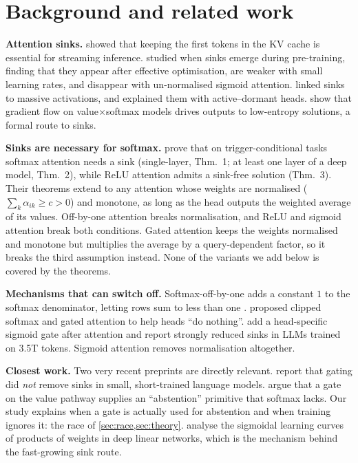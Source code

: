 \documentclass{article} %
\begin{document}
\section{Background and related work}
\textbf{Attention sinks.} \citet{xiao2024streamingllm} showed that keeping the first tokens in the KV cache is
essential for streaming inference. \citet{gu2025when} studied when sinks emerge during pre-training, finding
that they appear after effective optimisation, are weaker with small learning rates, and disappear with
un-normalised sigmoid attention. \citet{sun2024massive} linked sinks to massive activations, and
\citet{guo2024active} explained them with active--dormant heads. \citet{varre2026polarizes} show that
gradient flow on value$\times$softmax models drives outputs to low-entropy solutions, a formal route to sinks.

\textbf{Sinks are necessary for softmax.} \citet{ranmilo2026sinks} prove that on trigger-conditional tasks
softmax attention needs a sink (single-layer, Thm.~1; at least one layer of a deep model, Thm.~2),
while ReLU attention admits a sink-free solution (Thm.~3). Their theorems extend to any attention whose
weights are normalised ($\sum_k \alpha_{ik}\ge c>0$) and monotone, as long as the head outputs the weighted
average of its values. Off-by-one attention breaks normalisation, and ReLU and sigmoid attention break both
conditions. Gated attention keeps the weights normalised and monotone but multiplies the average by a
query-dependent factor, so it breaks the third assumption instead. None of the variants we add below is
covered by the theorems.

\textbf{Mechanisms that can switch off.} Softmax-off-by-one adds a constant $1$ to the softmax
denominator, letting rows sum to less than one \citep{miller2023off}. \citet{bondarenko2023quantizable}
proposed clipped softmax and gated attention to help heads ``do nothing''. \citet{qiu2025gated} add a
head-specific sigmoid gate after attention and report strongly reduced sinks in LLMs trained on 3.5T
tokens. Sigmoid attention \citep{ramapuram2025sigmoid} removes normalisation altogether.

\textbf{Closest work.} Two very recent preprints are directly relevant. \citet{rizwan2026new} report that
gating did \emph{not} remove sinks in small, short-trained language models. \citet{wang2026abstention} argue
that a gate on the value pathway supplies an ``abstention'' primitive that softmax lacks. Our study explains
when a gate is actually used for abstention and when training ignores it: the race of \cref{sec:race,sec:theory}.
\citet{saxe2014exact} analyse the sigmoidal learning curves of products of weights in deep linear networks,
which is the mechanism behind the fast-growing sink route.
\end{document}
